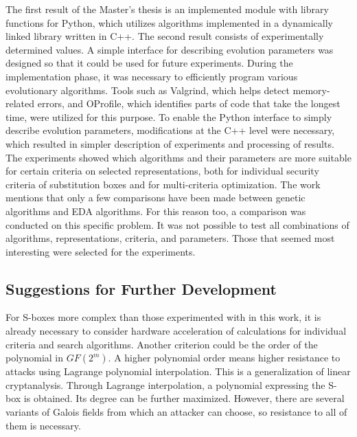 %
%
%
%
%
%
%
The first result of the Master's thesis is an implemented module with library functions for Python, which
utilizes algorithms implemented in a dynamically linked library written in C++.
The second result consists of experimentally determined values.
A simple interface for describing evolution parameters was designed so that it could be
used for future experiments.
During the implementation phase, it was necessary to efficiently program various evolutionary algorithms.
Tools such as Valgrind, which helps detect memory-related errors, and OProfile, which identifies parts of code that
take the longest time, were utilized for this purpose.
To enable the Python interface to simply describe evolution
parameters, modifications at the C++ level were necessary, which resulted in simpler description
of experiments and processing of results.
The experiments showed which algorithms and their parameters are more suitable for certain
criteria on selected representations, both
for individual security criteria of substitution boxes and for multi-criteria
optimization.
The work \cite{evo} mentions that only a few comparisons have been made between
genetic algorithms and EDA algorithms.
For this reason too, a comparison was conducted on this specific problem.
It was not possible to test all combinations of algorithms, representations, criteria, and parameters.
Those that seemed most interesting were selected for the experiments.

\subsection*{Suggestions for Further Development}
For S-boxes more complex than those experimented with in this work, it is already
necessary to consider hardware acceleration of calculations for individual criteria and search
algorithms.
Another criterion could be the order of the polynomial in $GF(2^m)$.
A higher polynomial order \cite{langrangeAttack, courtois} means higher resistance to attacks using Lagrange polynomial
interpolation.
This is a generalization of linear cryptanalysis. Through Lagrange interpolation,
a polynomial expressing the S-box is obtained. Its degree can be further maximized.
However, there are several variants of Galois fields from which an attacker can choose, so resistance
to all of them is necessary.
